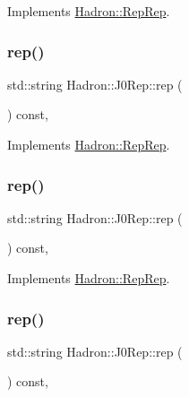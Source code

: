 Implements \mbox{\hyperlink{structHadron_1_1RepRep_ab3213025f6de249f7095892109575fde}{Hadron\+::\+Rep\+Rep}}.

\mbox{\label{structHadron_1_1J0Rep_a357214188122dd0e69716a4f7ff098b1}} 
\subsubsection{\texorpdfstring{rep()}{rep()}\hspace{0.1cm}{\footnotesize\ttfamily [2/5]}}
{\footnotesize\ttfamily std\+::string Hadron\+::\+J0\+Rep\+::rep (\begin{DoxyParamCaption}{ }\end{DoxyParamCaption}) const\hspace{0.3cm}{\ttfamily [inline]}, {\ttfamily [virtual]}}



Implements \mbox{\hyperlink{structHadron_1_1RepRep_ab3213025f6de249f7095892109575fde}{Hadron\+::\+Rep\+Rep}}.

\mbox{\label{structHadron_1_1J0Rep_a357214188122dd0e69716a4f7ff098b1}} 
\subsubsection{\texorpdfstring{rep()}{rep()}\hspace{0.1cm}{\footnotesize\ttfamily [3/5]}}
{\footnotesize\ttfamily std\+::string Hadron\+::\+J0\+Rep\+::rep (\begin{DoxyParamCaption}{ }\end{DoxyParamCaption}) const\hspace{0.3cm}{\ttfamily [inline]}, {\ttfamily [virtual]}}



Implements \mbox{\hyperlink{structHadron_1_1RepRep_ab3213025f6de249f7095892109575fde}{Hadron\+::\+Rep\+Rep}}.

\mbox{\label{structHadron_1_1J0Rep_a357214188122dd0e69716a4f7ff098b1}} 
\subsubsection{\texorpdfstring{rep()}{rep()}\hspace{0.1cm}{\footnotesize\ttfamily [4/5]}}
{\footnotesize\ttfamily std\+::string Hadron\+::\+J0\+Rep\+::rep (\begin{DoxyParamCaption}{ }\end{DoxyParamCaption}) const\hspace{0.3cm}{\ttfamily [inline]}, {\ttfamily [virtual]}}



